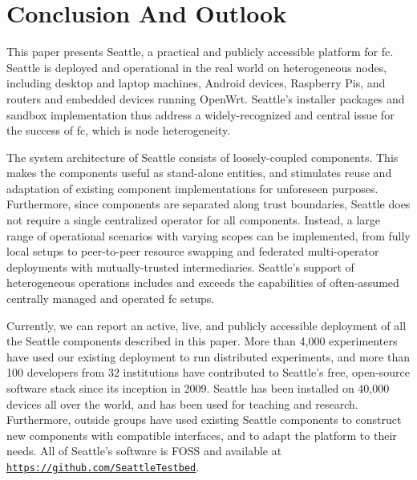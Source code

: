 \section{Conclusion And Outlook}

This paper presents Seattle, a practical and publicly accessible
platform for \gls{fc}. Seattle is deployed and operational in the
real world on heterogeneous nodes,
including desktop and laptop machines, Android devices,
Raspberry Pis,
and routers and embedded devices running OpenWrt.
Seattle's installer packages and sandbox implementation
thus address a widely-recognized and central issue for the
success of \gls{fc}, which is node heterogeneity.

The system architecture of Seattle consists of loosely-coupled
components. This makes the components useful as stand-alone entities,
and stimulates reuse and adaptation of existing component
implementations for unforeseen purposes.
Furthermore, since components are separated along trust boundaries,
Seattle does not require a single centralized operator for all
components. Instead, a large range of operational scenarios with
varying scopes can be implemented, from fully local setups to
peer-to-peer resource swapping and federated multi-operator
deployments with mutually-trusted intermediaries.
Seattle's support of heterogeneous operations includes and exceeds
the capabilities of often-assumed centrally managed and
operated \gls{fc} setups.

Currently, we can report an active, live, and publicly accessible
deployment of all the Seattle components described in this paper.
More than 4,000 experimenters have used our existing deployment
to run distributed experiments, and more than 100 developers from
32 institutions
have contributed to Seattle's free, open-source software stack since
its inception in 2009.
Seattle has been installed on 40,000 devices all over the world, and
has been used
for teaching and research. Furthermore, outside groups have used existing
Seattle
components to construct new components with compatible interfaces, and
to adapt the platform to their needs.
All of Seattle's software is \acrlong{FOSS} and available at
\texttt{\url{https://github.com/SeattleTestbed}}.

